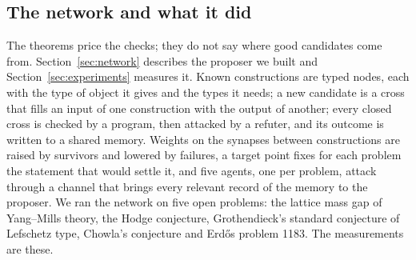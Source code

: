 \subsection{The network and what it did}

The theorems price the checks; they do not say where good candidates come from. Section~\ref{sec:network} describes the proposer we built and Section~\ref{sec:experiments} measures it. Known constructions are typed nodes, each with the type of object it gives and the types it needs; a new candidate is a cross that fills an input of one construction with the output of another; every closed cross is checked by a program, then attacked by a refuter, and its outcome is written to a shared memory. Weights on the synapses between constructions are raised by survivors and lowered by failures, a target point fixes for each problem the statement that would settle it, and five agents, one per problem, attack through a channel that brings every relevant record of the memory to the proposer. We ran the network on five open problems: the lattice mass gap of Yang--Mills theory, the Hodge conjecture, Grothendieck's standard conjecture of Lefschetz type, Chowla's conjecture and Erd\H{o}s problem 1183. The measurements are these.
